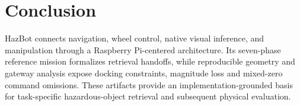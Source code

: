 \section{Conclusion}
HazBot connects navigation, wheel control, native visual inference, and manipulation through a Raspberry Pi-centered architecture. Its seven-phase reference mission formalizes retrieval handoffs, while reproducible geometry and gateway analysis expose docking constraints, magnitude loss and mixed-zero command omissions. These artifacts provide an implementation-grounded basis for task-specific hazardous-object retrieval and subsequent physical evaluation.
